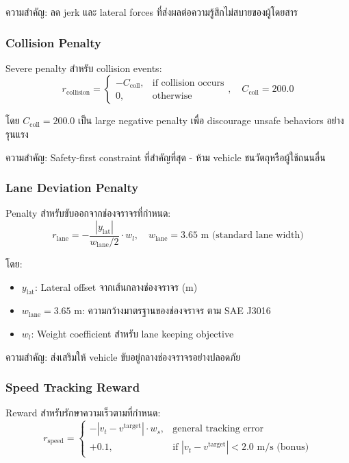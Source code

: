 \documentclass[10pt,a4paper,twocolumn]{article}
\begin{document}
ความสำคัญ: ลด jerk และ lateral forces ที่ส่งผลต่อความรู้สึกไม่สบายของผู้โดยสาร

\subsubsection{Collision Penalty}
Severe penalty สำหรับ collision events:
\begin{equation}\label{eq:collision-reward}
    r_{\text{collision}} = 
    \begin{cases}
        -C_{\text{coll}}, & \text{if collision occurs} \\
        0, & \text{otherwise}
    \end{cases}, \quad C_{\text{coll}} = 200.0
\end{equation}

โดย $C_{\text{coll}} = 200.0$ เป็น large negative penalty เพื่อ discourage unsafe behaviors อย่างรุนแรง

ความสำคัญ: Safety-first constraint ที่สำคัญที่สุด - ห้าม vehicle ชนวัตถุหรือผู้ใช้ถนนอื่น

\subsubsection{Lane Deviation Penalty}
Penalty สำหรับขับออกจากช่องจราจรที่กำหนด:
\begin{equation}\label{eq:lane-reward}
    r_{\text{lane}} = - \frac{|y_{\text{lat}}|}{w_{\text{lane}}/2} \cdot w_l, \quad w_{\text{lane}} = 3.65 \text{ m (standard lane width)}
\end{equation}

โดย:
\begin{itemize}
    \item $y_{\text{lat}}$: Lateral offset จากเส้นกลางช่องจราจร (m)
    \item $w_{\text{lane}} = 3.65$ m: ความกว้างมาตรฐานของช่องจราจร ตาม SAE J3016
    \item $w_l$: Weight coefficient สำหรับ lane keeping objective
\end{itemize}

ความสำคัญ: ส่งเสริมให้ vehicle ขับอยู่กลางช่องจราจรอย่างปลอดภัย

\subsubsection{Speed Tracking Reward}
Reward สำหรับรักษาความเร็วตามที่กำหนด:
\begin{equation}\label{eq:speed-reward}
    r_{\text{speed}} = 
    \begin{cases}
        -|v_t - v^{\text{target}}| \cdot w_s, & \text{general tracking error} \\
        +0.1, & \text{if } |v_t - v^{\text{target}}| < 2.0 \text{ m/s (bonus)}
    \end{cases}
\end{equation}
\end{document}
